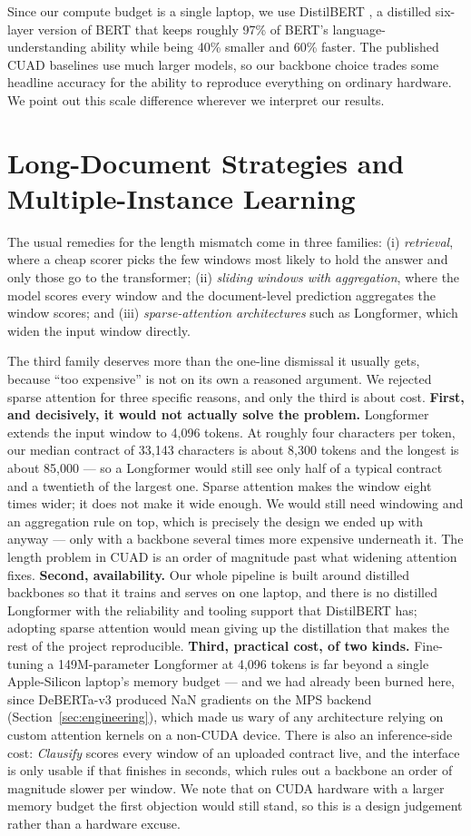 Since our compute budget is a single laptop, we use DistilBERT \cite{sanh2019distilbert}, a distilled six-layer version of BERT that keeps roughly 97\% of BERT's language-understanding ability while being 40\% smaller and 60\% faster. The published CUAD baselines use much larger models, so our backbone choice trades some headline accuracy for the ability to reproduce everything on ordinary hardware. We point out this scale difference wherever we interpret our results.

\section{Long-Document Strategies and Multiple-Instance Learning}
The usual remedies for the length mismatch come in three families: (i) \emph{retrieval}, where a cheap scorer picks the few windows most likely to hold the answer and only those go to the transformer; (ii) \emph{sliding windows with aggregation}, where the model scores every window and the document-level prediction aggregates the window scores; and (iii) \emph{sparse-attention architectures} such as Longformer, which widen the input window directly.

The third family deserves more than the one-line dismissal it usually gets, because ``too expensive'' is not on its own a reasoned argument. We rejected sparse attention for three specific reasons, and only the third is about cost. \textbf{First, and decisively, it would not actually solve the problem.} Longformer extends the input window to 4{,}096 tokens. At roughly four characters per token, our median contract of 33{,}143 characters is about 8{,}300 tokens and the longest is about 85{,}000 --- so a Longformer would still see only half of a typical contract and a twentieth of the largest one. Sparse attention makes the window eight times wider; it does not make it wide enough. We would still need windowing and an aggregation rule on top, which is precisely the design we ended up with anyway --- only with a backbone several times more expensive underneath it. The length problem in CUAD is an order of magnitude past what widening attention fixes. \textbf{Second, availability.} Our whole pipeline is built around distilled backbones so that it trains and serves on one laptop, and there is no distilled Longformer with the reliability and tooling support that DistilBERT has; adopting sparse attention would mean giving up the distillation that makes the rest of the project reproducible. \textbf{Third, practical cost, of two kinds.} Fine-tuning a 149M-parameter Longformer at 4{,}096 tokens is far beyond a single Apple-Silicon laptop's memory budget --- and we had already been burned here, since DeBERTa-v3 produced NaN gradients on the MPS backend (Section~\ref{sec:engineering}), which made us wary of any architecture relying on custom attention kernels on a non-CUDA device. There is also an inference-side cost: \emph{Clausify} scores every window of an uploaded contract live, and the interface is only usable if that finishes in seconds, which rules out a backbone an order of magnitude slower per window. We note that on CUDA hardware with a larger memory budget the first objection would still stand, so this is a design judgement rather than a hardware excuse.

